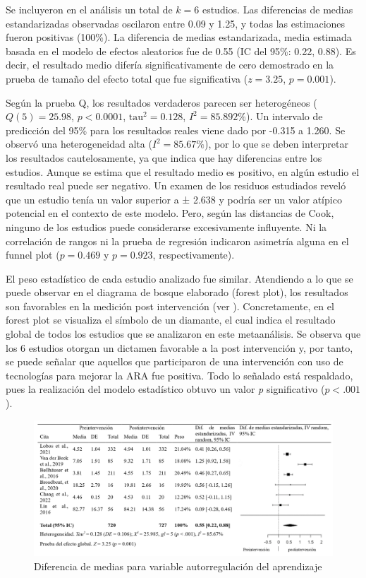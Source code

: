\documentclass[spanish]{textolivre}
\begin{document}
Se incluyeron en el análisis un total de $k = 6$ estudios. Las diferencias de medias estandarizadas observadas oscilaron entre 0.09 y 1.25, y todas las estimaciones fueron positivas (100\%). La diferencia de medias estandarizada, media estimada basada en el modelo de efectos aleatorios fue de 0.55 (IC del 95\%: 0.22, 0.88). Es decir, el resultado medio difería significativamente de cero demostrado en la prueba de tamaño del efecto total que fue significativa ($z = 3.25$, $p = 0.001$). 

Según la prueba Q, los resultados verdaderos parecen ser heterogéneos ($Q(5) = 25.98$, $p < 0.0001$, $\text{tau}^2 = 0.128$, $I^2 = 85.892\%$). Un intervalo de predicción del 95\% para los resultados reales viene dado por -0.315 a 1.260. Se observó una heterogeneidad alta ($I^2 = 85.67\%$), por lo que se deben interpretar los resultados cautelosamente, ya que indica que hay diferencias entre los estudios. Aunque se estima que el resultado medio es positivo, en algún estudio el resultado real puede ser negativo. Un examen de los residuos estudiados reveló que un estudio \cite{van2020new} tenía un valor superior a ± 2.638 y podría ser un valor atípico potencial en el contexto de este modelo. Pero, según las distancias de Cook, ninguno de los estudios puede considerarse excesivamente influyente. Ni la correlación de rangos ni la prueba de regresión indicaron asimetría alguna en el funnel plot ($p = 0.469$ y $p = 0.923$, respectivamente).

El peso estadístico de cada estudio analizado fue similar. Atendiendo a lo que se puede observar en el diagrama de bosque elaborado (forest plot), los resultados son favorables en la medición post intervención (ver ). Concretamente, en el forest plot se visualiza el símbolo de un diamante, el cual indica el resultado global de todos los estudios que se analizaron en este metaanálisis. Se observa que los 6 estudios otorgan un dictamen favorable a la post intervención y, por tanto, se puede señalar que aquellos que participaron de una intervención con uso de tecnologías para mejorar la ARA fue positiva. Todo lo señalado está respaldado, pues la realización del modelo estadístico obtuvo un valor \emph{p} significativo ($p <.001$).

\begin{figure}[htbp]
\centering
\begin{minipage}{\textwidth}
 \includegraphics[width=\textwidth]{Fig2.jpeg}
 \caption{Diferencia de medias para variable autorregulación del aprendizaje}
 \label{fig2}
\end{minipage}
\end{figure}
\end{document}
